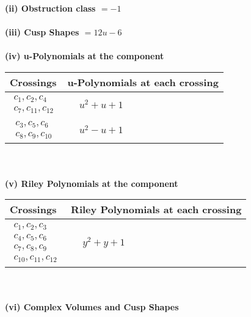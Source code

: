 \documentclass[1p]{elsarticle_modified}
\theoremstyle{definition}
\begin{document}
\flushleft \textbf{(ii) Obstruction class $= -1$}\\~\\
\flushleft \textbf{(iii) Cusp Shapes $= 12 u-6$}\\~\\
\newpage\renewcommand{\arraystretch}{1}
\flushleft \textbf{(iv) u-Polynomials at the component}\newline \\
\begin{tabular}{m{50pt}|m{274pt}}
Crossings & \hspace{64pt}u-Polynomials at each crossing \\
\hline $$\begin{aligned}c_{1},c_{2},c_{4}\\c_{7},c_{11},c_{12}\end{aligned}$$&$\begin{aligned}
&u^2+u+1
\end{aligned}$\\
\hline $$\begin{aligned}c_{3},c_{5},c_{6}\\c_{8},c_{9},c_{10}\end{aligned}$$&$\begin{aligned}
&u^2- u+1
\end{aligned}$\\
\hline
\end{tabular}\\~\\
\newpage\renewcommand{\arraystretch}{1}
\flushleft \textbf{(v) Riley Polynomials at the component}\newline \\
\begin{tabular}{m{50pt}|m{274pt}}
Crossings & \hspace{64pt}Riley Polynomials at each crossing \\
\hline $$\begin{aligned}c_{1},c_{2},c_{3}\\c_{4},c_{5},c_{6}\\c_{7},c_{8},c_{9}\\c_{10},c_{11},c_{12}\end{aligned}$$&$\begin{aligned}
&y^2+y+1
\end{aligned}$\\
\hline
\end{tabular}\\~\\
\newpage\flushleft \textbf{(vi) Complex Volumes and Cusp Shapes}
\end{document}
